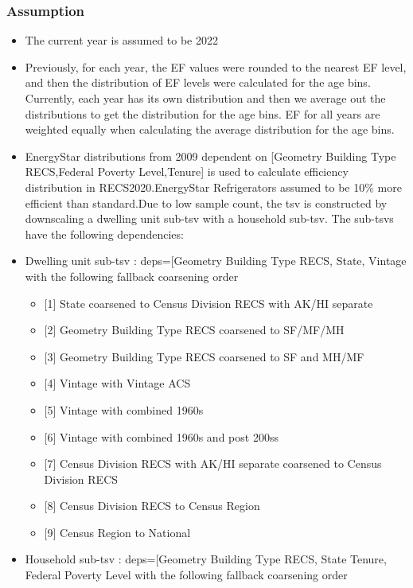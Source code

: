 \subsubsection{Assumption}\label{assumption-68}

\begin{itemize}
 
\item
  The current year is assumed to be 2022
\item
  Previously, for each year, the EF values were rounded to the nearest
  EF level, and then the distribution of EF levels were calculated for
  the age bins. Currently, each year has its own distribution and then
  we average out the distributions to get the distribution for the age
  bins. EF for all years are weighted equally when calculating the
  average distribution for the age bins.
\item
  EnergyStar distributions from 2009 dependent on {[}Geometry Building
  Type RECS,Federal Poverty Level,Tenure{]} is used to calculate
  efficiency distribution in RECS2020.EnergyStar Refrigerators assumed
  to be 10\% more efficient than standard.Due to low sample count, the
  tsv is constructed by downscaling a dwelling unit sub-tsv with a
  household sub-tsv. The sub-tsvs have the following dependencies:
\item
  Dwelling unit sub-tsv : deps={[}\textquotesingle Geometry Building
  Type RECS\textquotesingle, \textquotesingle State\textquotesingle,
  \textquotesingle Vintage\textquotesingle{]} with the following
  fallback coarsening order

  \begin{itemize}
   
  \item
    {[}1{]} State coarsened to Census Division RECS with AK/HI separate
  \item
    {[}2{]} Geometry Building Type RECS coarsened to SF/MF/MH
  \item
    {[}3{]} Geometry Building Type RECS coarsened to SF and MH/MF
  \item
    {[}4{]} Vintage with Vintage ACS
  \item
    {[}5{]} Vintage with combined 1960s
  \item
    {[}6{]} Vintage with combined 1960s and post 200ss
  \item
    {[}7{]} Census Division RECS with AK/HI separate coarsened to Census
    Division RECS
  \item
    {[}8{]} Census Division RECS to Census Region
  \item
    {[}9{]} Census Region to National
  \end{itemize}
\item
  Household sub-tsv : deps={[}\textquotesingle Geometry Building Type
  RECS\textquotesingle, \textquotesingle State\textquotesingle{}
  \textquotesingle Tenure\textquotesingle, \textquotesingle Federal
  Poverty Level\textquotesingle{]} with the following fallback
  coarsening order


\end{itemize}
